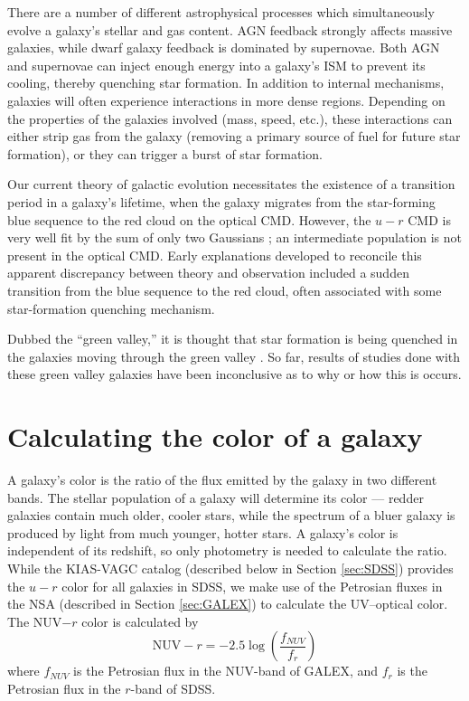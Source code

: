 There are a number of different astrophysical processes which simultaneously 
evolve a galaxy's stellar and gas content.  AGN feedback strongly affects 
massive galaxies, while dwarf galaxy feedback is dominated by supernovae.  Both 
AGN and supernovae can inject enough energy into a galaxy's ISM to prevent its 
cooling, thereby quenching star formation.  In addition to internal mechanisms, 
galaxies will often experience interactions in more dense regions.  Depending on 
the properties of the galaxies involved (mass, speed, etc.), these interactions 
can either strip gas from the galaxy (removing a primary source of fuel for 
future star formation), or they can trigger a burst of star formation.

Our current theory of galactic evolution necessitates the existence of a 
transition period in a galaxy's lifetime, when the galaxy migrates from the 
star-forming blue sequence to the red cloud on the optical CMD.  However, the 
$u-r$ CMD is very well fit by the sum of only two Gaussians \citep{Strateva01, 
Baldry04}; an intermediate population is not present in the optical CMD.  Early 
explanations developed to reconcile this apparent discrepancy between theory and 
observation included a sudden transition from the blue sequence to the red 
cloud, often associated with some star-formation quenching mechanism.

Dubbed the ``green valley,'' it is thought that star formation 
is being quenched in the galaxies moving through the green valley 
\citep{Martin07}.  So far, results of studies done with these green valley 
galaxies have been inconclusive as to why or how this is occurs.




\section[Theory]{Calculating the color of a galaxy}

A galaxy's color is the ratio of the flux emitted by the galaxy in two different 
bands.  The stellar population of a galaxy will determine its color --- redder 
galaxies contain much older, cooler stars, while the spectrum of a bluer galaxy 
is produced by light from much younger, hotter stars.  A galaxy's color is 
independent of its redshift, so only photometry is needed to calculate the 
ratio.  While the KIAS-VAGC catalog (described below in Section \ref{sec:SDSS}) 
provides the $u-r$ color for all galaxies in SDSS, we make use of the Petrosian 
fluxes in the NSA (described in Section \ref{sec:GALEX}) to calculate the 
UV--optical color.  The NUV$-r$ color is calculated by
\begin{equation}
    \text{NUV}-r = -2.5\log \left( \frac{f_{NUV}}{f_r} \right)
\end{equation}
where $f_{NUV}$ is the Petrosian flux in the NUV-band of GALEX, and $f_r$ is the 
Petrosian flux in the $r$-band of SDSS.


